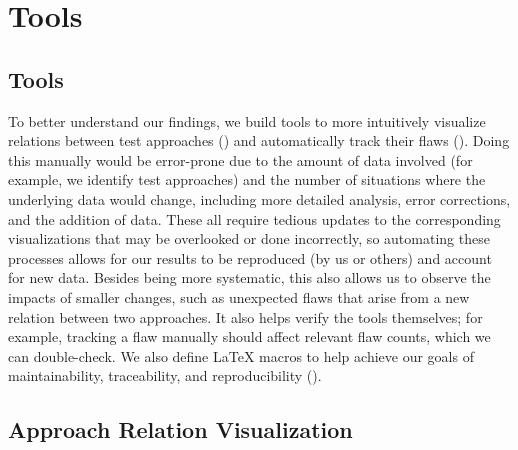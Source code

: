 \ifnotpaper\section{Tools}
\else\subsection{Tools}
\fi\label{tools}

\ifnotpaper
    To better understand our findings, we build tools to more intuitively
    visualize relations between test approaches () and
    automatically track their flaws (). Doing
    this manually would be error-prone due to the amount of data involved (for
    example, we identify \approachCount{} test approaches) and the number of
    situations where the underlying data would change, including more detailed
    analysis, error corrections, and the addition of data. These all require
    tedious updates to the corresponding visualizations that may be overlooked
    or done incorrectly, so automating these processes allows for our results
    to be reproduced (by us or others) and account for new data. Besides being
    more systematic, this also allows us to observe the impacts of smaller
    changes, such as unexpected flaws that arise from a new relation between
    two approaches. It also helps verify the tools themselves; for example,
    tracking a flaw manually should affect relevant flaw counts, which we can
    double-check. We also define \LaTeX{} macros to help achieve our goals of
    maintainability, traceability, and reproducibility ().

    \subsection{Approach Relation Visualization}\label{app-rel-vis}
\fi

